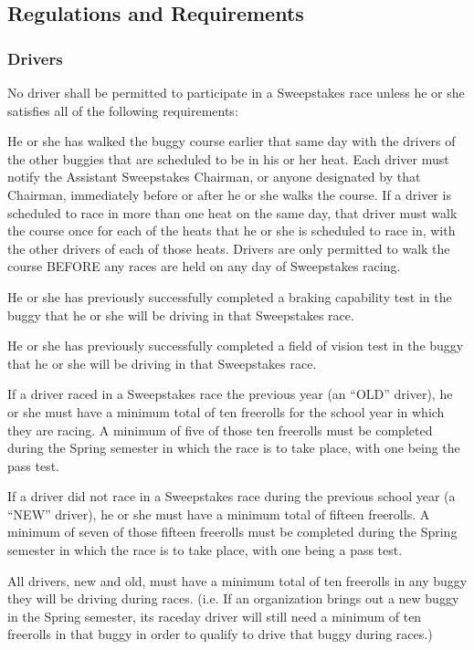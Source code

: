 \subsection{Regulations and Requirements}

\subsubsection{Drivers}

	No driver shall be permitted to participate in a Sweepstakes race unless he or
	she satisfies all of the following requirements:

	He or she has walked the buggy course earlier that same day with the drivers of
	the other buggies that are scheduled to be in his or her heat. Each driver must
	notify the Assistant Sweepstakes Chairman, or anyone designated by that
	Chairman, immediately before or after he or she walks the course. If a driver
	is scheduled to race in more than one heat on the same day, that driver must
	walk the course once for each of the heats that he or she is scheduled to race
	in, with the other drivers of each of those heats. Drivers are only permitted
	to walk the course BEFORE any races are held on any day of Sweepstakes racing.

	He or she has previously successfully completed a braking capability test in
	the buggy that he or she will be driving in that Sweepstakes race.

	He or she has previously successfully completed a field of vision test in the
	buggy that he or she will be driving in that Sweepstakes race.

	If a driver raced in a Sweepstakes race the previous year (an ``OLD'' driver),
	he or she must have a minimum total of ten freerolls for the school year in
	which they are racing. A minimum of five of those ten freerolls must be
	completed during the Spring semester in which the race is to take place, with
	one being the pass test.

	If a driver did not race in a Sweepstakes race during the previous school year
	(a ``NEW'' driver), he or she must have a minimum total of fifteen freerolls. A
	minimum of seven of those fifteen freerolls must be completed during the Spring
	semester in which the race is to take place, with one being a pass test.

	All drivers, new and old, must have a minimum total of ten freerolls in any
	buggy they will be driving during races. (i.e. If an organization brings out a
	new buggy in the Spring semester, its raceday driver will still need a minimum
	of ten freerolls in that buggy in order to qualify to drive that buggy during
	races.)

